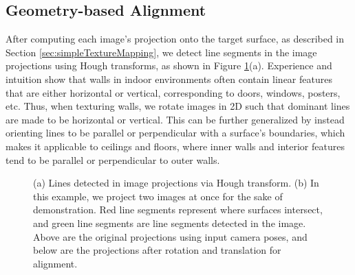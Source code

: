 \documentclass[]{spie}  %
\begin{document}
\subsection{Geometry-based Alignment}
\label{sec:geometryAlignment}
After computing each image's projection onto the target surface, as
described in Section \ref{sec:simpleTextureMapping}, we detect line
segments in the image projections using Hough transforms, as shown in
Figure \ref{fig:geometryAlignment}(a). Experience and intuition show
that walls in indoor environments often contain linear features that
are either horizontal or vertical, corresponding to doors, windows,
posters, etc. Thus, when texturing walls, we rotate images in 2D such
that dominant lines are made to be horizontal or vertical. This can be
further generalized by instead orienting lines to be parallel or
perpendicular with a surface's boundaries, which makes it applicable
to ceilings and floors, where inner walls and interior features tend
to be parallel or perpendicular to outer walls.

\begin{figure}
  \centering
  \hspace{0.4 cm} 
  \caption{(a) Lines detected in image projections via Hough
    transform.  (b) In this example, we project two images at once for
    the sake of demonstration. Red line segments represent where
    surfaces intersect, and green line segments are line segments
    detected in the image. Above are the original projections using
    input camera poses, and below are the projections after rotation
    and translation for alignment.}
  \label{fig:geometryAlignment}
\end{figure}
\end{document}
